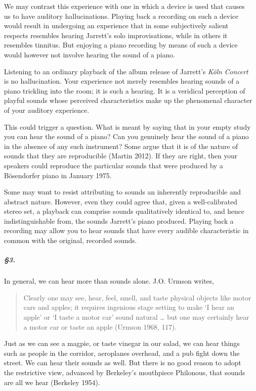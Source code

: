 \documentclass[sloppy, journal, git, anonymise]{humapap}
\begin{document}
We may contrast this experience with one in which a device is used that
causes us to have auditory hallucinations. Playing back a recording on
such a device would result in undergoing an experience that in some
subjectively salient respects resembles hearing Jarrett's solo
improvisations, while in others it resembles tinnitus. But enjoying a
piano recording by means of such a device would however not involve
hearing the sound of a piano.

Listening to an ordinary playback of the album release of Jarrett's
\emph{Köln Concert} is no hallucination. Your experience not merely
resembles hearing sounds of a piano trickling into the room; it is such
a hearing. It is a veridical perception of playful sounds whose
perceived characteristics make up the phenomenal character of your
auditory experience.

This could trigger a question. What is meant by saying that in your
empty study you can hear the sound of a piano? Can you genuinely hear
the sound of a piano in the absence of any such instrument? Some argue
that it is of the nature of sounds that they are reproducible (Martin
2012). If they are right, then your speakers could reproduce the
particular sounds that were produced by a Bösendorfer piano in January
1975.

Some may want to resist attributing to sounds an inherently reproducible
and abstract nature. However, even they could agree that, given a
well-calibrated stereo set, a playback can comprise sounds qualitatively
identical to, and hence indistinguishable from, the sounds Jarrett's
piano produced. Playing back a recording may allow you to hear sounds
that have every audible characteristic in common with the original,
recorded sounds.

\subparagraph{§3.}\label{section-2}

In general, we can hear more than sounds alone. J.O. Urmson writes,

\begin{quote}
Clearly one may see, hear, feel, smell, and taste physical objects like
motor cars and apples; it requires ingenious stage setting to make `I
hear an apple' or `I taste a motor car' sound natural \ldots{} but one
may certainly hear a motor car or taste an apple (Urmson 1968, 117).
\end{quote}

Just as we can see a magpie, or taste vinegar in our salad, we can hear
things such as people in the corridor, aeroplanes overhead, and a pub
fight down the street. We can hear their sounds as well. But there is no
good reason to adopt the restrictive view, advanced by Berkeley's
mouthpiece Philonous, that sounds are all we hear (Berkeley 1954).
\end{document}
